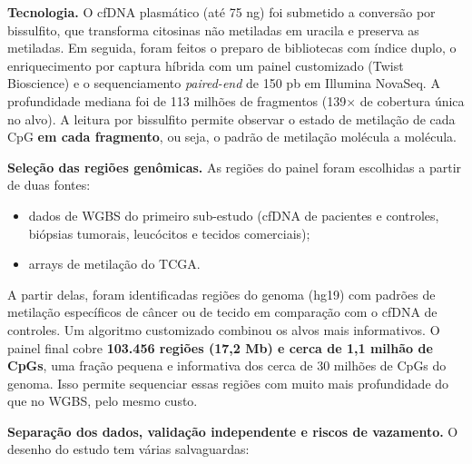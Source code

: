 \documentclass[11pt,a4paper]{article}
\providecommand{\tightlist}{\setlength{\itemsep}{0pt}\setlength{\parskip}{0pt}}
\begin{document}
\textbf{Tecnologia.} O cfDNA plasmático (até 75 ng) foi submetido a conversão
por bissulfito, que transforma citosinas não metiladas em uracila e preserva as
metiladas. Em seguida, foram feitos o preparo de bibliotecas com índice duplo, o
enriquecimento por captura híbrida com um painel customizado (Twist Bioscience)
e o sequenciamento \emph{paired-end} de 150 pb em Illumina NovaSeq. A
profundidade mediana foi de 113 milhões de fragmentos (139$\times$ de cobertura única
no alvo). A leitura por bissulfito permite observar o estado de metilação de
cada CpG \textbf{em cada fragmento}, ou seja, o padrão de metilação molécula a
molécula.

\textbf{Seleção das regiões genômicas.} As regiões do painel foram escolhidas a
partir de duas fontes:

\begin{itemize}
\tightlist
\item
  dados de WGBS do primeiro sub-estudo (cfDNA de pacientes e controles, biópsias
  tumorais, leucócitos e tecidos comerciais);
\item
  arrays de metilação do TCGA.
\end{itemize}

A partir delas, foram identificadas regiões do genoma (hg19) com padrões de
metilação específicos de câncer ou de tecido em comparação com o cfDNA de
controles. Um algoritmo customizado combinou os alvos mais informativos. O
painel final cobre \textbf{103.456 regiões (17,2 Mb) e cerca de 1,1 milhão de
CpGs}, uma fração pequena e informativa dos cerca de 30 milhões de CpGs do
genoma. Isso permite sequenciar essas regiões com muito mais profundidade do que
no WGBS, pelo mesmo custo.

\textbf{Separação dos dados, validação independente e riscos de vazamento.} O
desenho do estudo tem várias salvaguardas:
\end{document}
